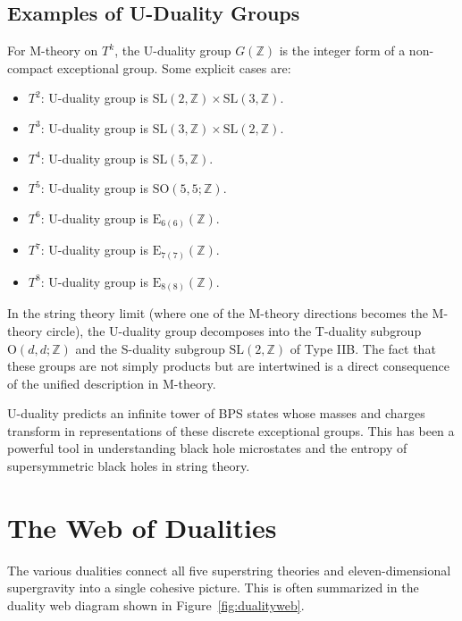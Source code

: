 \documentclass[11pt]{article}
\begin{document}
\subsection{Examples of U-Duality Groups}
For M-theory on $T^{k}$, the U-duality group $G(\mathbb{Z})$ is the integer form of a non-compact exceptional group. Some explicit cases are:
\begin{itemize}
    \item $T^2$: U-duality group is $\mathrm{SL}(2,\mathbb{Z}) \times \mathrm{SL}(3,\mathbb{Z})$.
    \item $T^3$: U-duality group is $\mathrm{SL}(3,\mathbb{Z}) \times \mathrm{SL}(2,\mathbb{Z})$.
    \item $T^4$: U-duality group is $\mathrm{SL}(5,\mathbb{Z})$.
    \item $T^5$: U-duality group is $\mathrm{SO}(5,5;\mathbb{Z})$.
    \item $T^6$: U-duality group is $\mathrm{E}_{6(6)}(\mathbb{Z})$.
    \item $T^7$: U-duality group is $\mathrm{E}_{7(7)}(\mathbb{Z})$.
    \item $T^8$: U-duality group is $\mathrm{E}_{8(8)}(\mathbb{Z})$.
\end{itemize}
In the string theory limit (where one of the M-theory directions becomes the M-theory circle), the U-duality group decomposes into the T-duality subgroup $\mathrm{O}(d,d;\mathbb{Z})$ and the S-duality subgroup $\mathrm{SL}(2,\mathbb{Z})$ of Type IIB. The fact that these groups are not simply products but are intertwined is a direct consequence of the unified description in M-theory.

U-duality predicts an infinite tower of BPS states whose masses and charges transform in representations of these discrete exceptional groups. This has been a powerful tool in understanding black hole microstates and the entropy of supersymmetric black holes in string theory.

\section{The Web of Dualities}
The various dualities connect all five superstring theories and eleven-dimensional supergravity into a single cohesive picture. This is often summarized in the duality web diagram shown in Figure~\ref{fig:dualityweb}.
\end{document}
